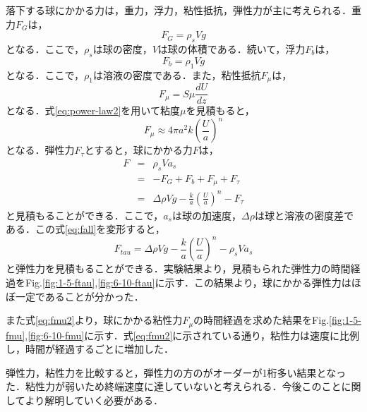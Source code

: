 落下する球にかかる力は，重力，浮力，粘性抵抗，弾性力が主に考えられる．重力$F_G$は，
\begin{equation}
    F_G = \rho_s Vg
    \label{eq:mg}
\end{equation}
となる．ここで，$\rho_s$は球の密度，$V$は球の体積である．続いて，浮力$F_b$は，
\begin{equation}
    F_b = \rho_1 Vg
    \label{eq:fb}
\end{equation}
となる．ここで，$\rho_1$は溶液の密度である．また，粘性抵抗$F_{\mu}$は，
\begin{equation}
    F_{\mu} =  S \mu \frac{dU}{dz}
    \label{eq:fmu}
\end{equation}
となる．式\ref{eq:power-law2}を用いて粘度$\mu$を見積もると，
\begin{equation}
    F_{\mu} \approx 4\pi a^2 k \left(\frac{U}{a}\right)^n
    \label{eq:fmu2}
\end{equation}
となる．弾性力$F_{\tau}$とすると，球にかかる力$F$は，
\begin{eqnarray}
    F & = & \rho_s V a_s \nonumber \\
    & = & - F_G + F_b + F_{\mu} + F_{\tau} \nonumber \\
    & = &  \Delta \rho Vg - \frac{k}{a}\left(\frac{U}{a}\right)^n - F_{\tau}
    \label{eq:fall}
\end{eqnarray}
と見積もることができる．ここで，$a_s$は球の加速度，$\Delta \rho$は球と溶液の密度差である．この式\ref{eq:fall}を変形すると，
\begin{equation}
    F_{tau} = \Delta \rho Vg - \frac{k}{a}\left(\frac{U}{a}\right)^n - \rho_s V a_s
    \label{eq:ftau}
\end{equation}
と弾性力を見積もることができる．実験結果より，見積もられた弾性力の時間経過をFig.\ref{fig:1-5-ftau},\ref{fig:6-10-ftau}に示す．この結果より，球にかかる弾性力はほぼ一定であることが分かった．

また式\ref{eq:fmu2}より，球にかかる粘性力$F_{\mu}$の時間経過を求めた結果をFig.\ref{fig:1-5-fmu},\ref{fig:6-10-fmu}に示す．式\ref{eq:fmu2}に示されている通り，粘性力は速度に比例し，時間が経過するごとに増加した．

弾性力，粘性力を比較すると，弾性力の方のがオーダーが1桁多い結果となった．粘性力が弱いため終端速度に達していないと考えられる．今後このことに関してより解明していく必要がある．


